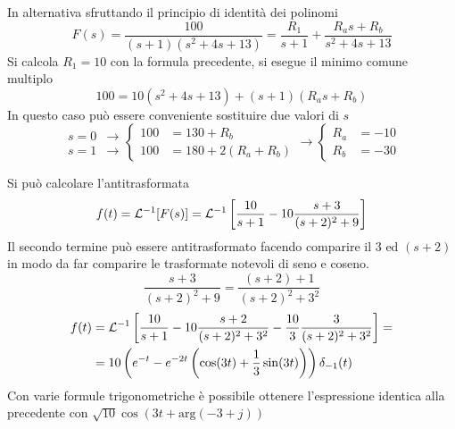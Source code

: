 In alternativa sfruttando il principio di identità dei polinomi
$$
F(s) = \frac{100}{(s+1)(s^2 + 4s + 13)} = \frac{R_1}{s+1} +
\frac{R_as+R_b}{s^2+4s+13}
$$
Si calcola $R_1=10$ con la formula precedente, si esegue il minimo comune
multiplo
$$
100 = 10(s^2+4s + 13)+(s+1)(R_as+R_b)
$$
In questo caso può essere conveniente sostituire due valori di $s$
$$
\begin{aligned}
s=0 &\rightarrow\\
s=1 &\rightarrow
\end{aligned}
\left\{
\begin{aligned}
 100 &= 130 + R_b\\
 100 &= 180 + 2(R_a + R_b)
\end{aligned}\right.
\rightarrow
\left\{
\begin{aligned}
R_a &= -10\\
R_b &= -30
\end{aligned}
\right.
$$

\newpage
Si può calcolare l'antitrasformata
$$
f(t) = \mathcal{L}^{-1} [F(s)] = \mathcal{L}^{-1} \left[
\frac{10}{s+1} -10\frac{s+3}{(s+2)^2+9}
\right]
$$
Il secondo termine può essere antitrasformato facendo comparire il $3$ ed
$(s+2)$ in modo da far comparire le trasformate notevoli di seno e coseno.
$$
\frac{s+3  }{(s+2)^2 + 9}  =\frac{(s+2)+1}{(s+2)^2 + 3^2}
$$
$$\begin{aligned}
f(t) &=
\mathcal{L}^{-1}\left[\frac{10}{s+1}-10\frac{s+2}{(s+2)^2+3^2}-\frac{10}{3}\frac{3
} {(s+2)^2 +3^2} \right] =\\
&= 10\left(e^{-t} -e^{-2t} \left( \cos(3t)+\frac{1}{3}\sin(3t) \right)
\right)\delta_{-1}(t)
\end{aligned}$$
Con varie formule trigonometriche è possibile ottenere l'espressione identica
alla precedente con $\sqrt{10}\cos(3t+
\text{arg}(-3+j))$

